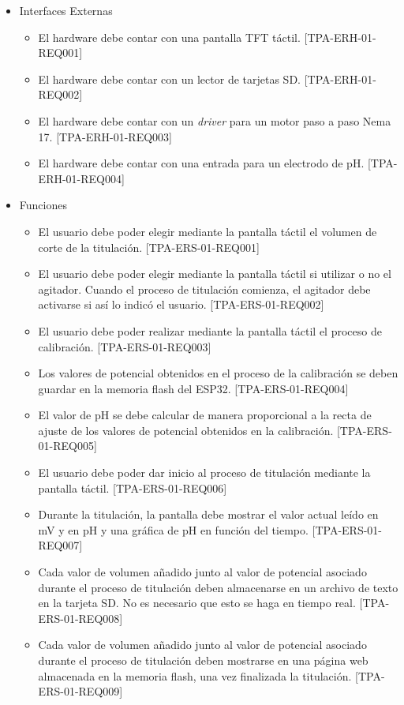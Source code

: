 \begin{itemize}
\item Interfaces Externas
	\begin{itemize}
	\item El hardware debe contar con una pantalla TFT táctil. [TPA-ERH-01-REQ001]
	\item El hardware debe contar con un lector de tarjetas SD. [TPA-ERH-01-REQ002]
	\item El hardware debe contar con un \textit{driver} para un motor paso a paso Nema 17. [TPA-ERH-01-REQ003]
	\item El hardware debe contar con una entrada para un electrodo de pH. [TPA-ERH-01-REQ004]
	\end{itemize}
	
\item Funciones
	\begin{itemize}
	\item El usuario debe poder elegir mediante la pantalla táctil el volumen de corte de la titulación. [TPA-ERS-01-REQ001]
	\item El usuario debe poder elegir mediante la pantalla táctil si utilizar o no el agitador. Cuando el proceso de titulación comienza, el agitador debe activarse si así lo indicó el usuario. [TPA-ERS-01-REQ002]
	\item El usuario debe poder realizar mediante la pantalla táctil el proceso de calibración. [TPA-ERS-01-REQ003]
	\item Los valores de potencial obtenidos en el proceso de la calibración se deben guardar en la memoria flash del ESP32. [TPA-ERS-01-REQ004]
	\item El valor de pH se debe calcular de manera proporcional a la recta de ajuste de los valores de potencial obtenidos en la calibración. [TPA-ERS-01-REQ005]
	\item El usuario debe poder dar inicio al proceso de titulación mediante la pantalla táctil. [TPA-ERS-01-REQ006]
	\item Durante la titulación, la pantalla debe mostrar el valor actual leído en mV y en pH y una gráfica de pH en función del tiempo. [TPA-ERS-01-REQ007]
	\item Cada valor de volumen añadido junto al valor de potencial asociado durante el proceso de titulación deben almacenarse en un archivo de texto en la tarjeta SD. No es necesario que esto se haga en tiempo real. [TPA-ERS-01-REQ008]
	\item Cada valor de volumen añadido junto al valor de potencial asociado durante el proceso de titulación deben mostrarse en una página web almacenada en la memoria flash, una vez finalizada la titulación. [TPA-ERS-01-REQ009]

\end{itemize}
\end{itemize}
